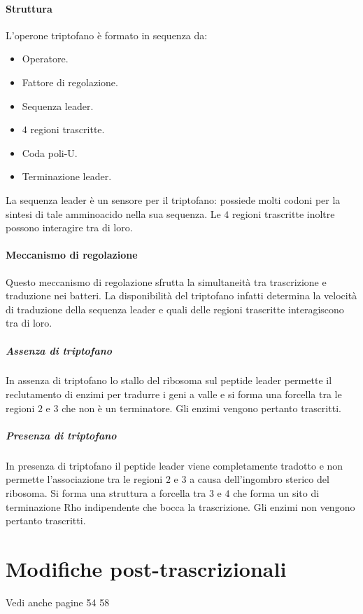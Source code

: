			\paragraph{Struttura}
			L'operone triptofano \`e formato in sequenza da:
			\begin{multicols}{2}
				\begin{itemize}
					\item Operatore.
					\item Fattore di regolazione.
					\item Sequenza leader.
					\item $4$ regioni trascritte.
					\item Coda poli-U.
					\item Terminazione leader.
				\end{itemize}
			\end{multicols}
			La sequenza leader \`e un sensore per il triptofano: possiede molti codoni per la sintesi di tale amminoacido nella sua sequenza.
			Le $4$ regioni trascritte inoltre possono interagire tra di loro.

			\paragraph{Meccanismo di regolazione}
			Questo meccanismo di regolazione sfrutta la simultaneit\`a tra trascrizione e traduzione nei batteri.
			La disponibilit\`a del triptofano infatti determina la velocit\`a di traduzione della sequenza leader e quali delle regioni trascritte interagiscono tra di loro.

				\subparagraph{Assenza di triptofano}
				In assenza di triptofano lo stallo del ribosoma sul peptide leader permette il reclutamento di enzimi per tradurre i geni a valle e si forma una forcella tra le regioni $2$ e $3$ che non \`e un terminatore.
				Gli enzimi vengono pertanto trascritti.

				\subparagraph{Presenza di triptofano}
				In presenza di triptofano il peptide leader viene completamente tradotto e non permette l'associazione tra le regioni $2$ e $3$ a causa dell'ingombro sterico del ribosoma.
				Si forma una struttura a forcella tra $3$ e $4$ che forma un sito di terminazione Rho indipendente che bocca la trascrizione.
				Gli enzimi non vengono pertanto trascritti.

\section{Modifiche post-trascrizionali}
Vedi anche pagine 54 58

